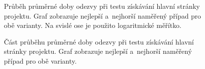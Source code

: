             \begin{figure}[h!t]
             \begin{adjustwidth}{-0.5cm}{}
                \begin{center}
                    \caption{Průběh průměrné doby odezvy při testu získávání hlavní stránky projektu.
                        Graf zobrazuje nejlepší a~nejhorší naměřený případ pro obě varianty.  
                        Na svislé ose je použito logaritmické měřítko.}
                    \label{imgGetMainPageCely}
                \end{center}
             \end{adjustwidth}
            \end{figure}

            \begin{figure}[h!t]
             \begin{adjustwidth}{-0.5cm}{}
                \begin{center}
                    \caption{Část průběhu průměrné doby odezvy  při testu získávání hlavní stránky projektu.
                        Graf zobrazuje nejlepší a~nejhorší naměřený případ pro obě varianty.}
                    \label{imgGetMainPageCast}
                \end{center}
             \end{adjustwidth}
            \end{figure}


